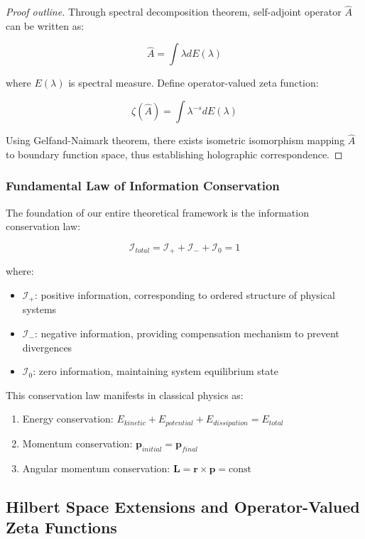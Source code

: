\documentclass[12pt,a4paper]{article}
\begin{document}
\begin{proof}[Proof outline]
Through spectral decomposition theorem, self-adjoint operator $\hat{A}$ can be written as:

$$\hat{A} = \int \lambda dE(\lambda)$$

where $E(\lambda)$ is spectral measure. Define operator-valued zeta function:

$$\zeta(\hat{A}) = \int \lambda^{-s} dE(\lambda)$$

Using Gelfand-Naimark theorem, there exists isometric isomorphism mapping $\hat{A}$ to boundary function space, thus establishing holographic correspondence.
\end{proof}

\subsubsection{Fundamental Law of Information Conservation}

The foundation of our entire theoretical framework is the information conservation law:

$$\mathcal{I}_{total} = \mathcal{I}_+ + \mathcal{I}_- + \mathcal{I}_0 = 1$$

where:
\begin{itemize}
\item $\mathcal{I}_+$: positive information, corresponding to ordered structure of physical systems
\item $\mathcal{I}_-$: negative information, providing compensation mechanism to prevent divergences
\item $\mathcal{I}_0$: zero information, maintaining system equilibrium state
\end{itemize}

This conservation law manifests in classical physics as:
\begin{enumerate}
\item Energy conservation: $E_{kinetic} + E_{potential} + E_{dissipation} = E_{total}$
\item Momentum conservation: $\mathbf{p}_{initial} = \mathbf{p}_{final}$
\item Angular momentum conservation: $\mathbf{L} = \mathbf{r} \times \mathbf{p} = \text{const}$
\end{enumerate}

\subsection{Hilbert Space Extensions and Operator-Valued Zeta Functions}
\end{document}
